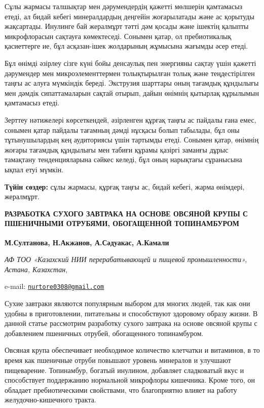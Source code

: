 Сұлы жармасы талшықтар мен дәрумендердің қажетті мөлшерін қамтамасыз
етеді, ал бидай кебегі минералдардың деңгейін жоғарылатады және ас
қорытуды жақсартады. Инулинге бай жералмұрт тәтті дәм қосады және
ішектің қалыпты микрофлорасын сақтауға көмектеседі. Сонымен қатар, ол
пребиотикалық қасиеттерге ие, бұл асқазан-ішек жолдарының жұмысына
жағымды әсер етеді.

Бұл өнімді әзірлеу сізге күні бойы денсаулық пен энергияны сақтау үшін
қажетті дәрумендер мен микроэлементтермен толықтырылған толық және
теңдестірілген таңғы ас алуға мүмкіндік береді. Экструзия шарттары оның
тағамдық құндылығы мен дәмдік сипаттамаларын сақтай отырып, дайын
өнімнің қытырлақ құрылымын қамтамасыз етеді.

Зерттеу нәтижелері көрсеткендей, әзірленген құрғақ таңғы ас пайдалы ғана
емес, сонымен қатар пайдалы тағамның дәмді нұсқасы болып табылады, бұл
оны тұтынушылардың кең аудиториясы үшін тартымды етеді. Сонымен қатар,
өнімнің жоғары тағамдық құндылығы мен табиғи құрамы қазіргі заманғы
дұрыс тамақтану тенденцияларына сәйкес келеді, бұл оның нарықтағы
сұранысына ықпал етуі мүмкін.

{\bfseries Түйін сөздер:} сұлы жармасы, құрғақ таңғы ас, бидай кебегі,
жарма өнімдері, жералмұрт.

{\bfseries РАЗРАБОТКА СУХОГО ЗАВТРАКА НА ОСНОВЕ ОВСЯНОЙ КРУПЫ С ПШЕНИЧНЫМИ
ОТРУБЯМИ, ОБОГАЩЕННОЙ ТОПИНАМБУРОМ}

{\bfseries М.Султанова, Н.Акжанов\textsuperscript{\envelope }, А.Сәдуакас, А.Камали}

\emph{АФ ТОО «Казахский НИИ перерабатывающей и пищевой промышленности»,
Астана, Казахстан},

e-mail:
\href{mailto:nurtore0308@gmail.com}{\nolinkurl{nurtore0308@gmail.com}}

Сухие завтраки являются популярным выбором для многих людей, так как они
удобны в приготовлении, питательны и способствуют здоровому образу
жизни. В данной статье рассмотрим разработку сухого завтрака на основе
овсяной крупы с добавлением пшеничных отрубей, обогащенного
топинамбуром.

Овсяная крупа обеспечивает необходимое количество клетчатки и витаминов,
в то время как пшеничные отруби повышают уровень минералов и улучшают
пищеварение. Топинамбур, богатый инулином, добавляет сладковатый вкус и
способствует поддержанию нормальной микрофлоры кишечника. Кроме того, он
обладает пребиотическими свойствами, что благоприятно влияет на работу
желудочно-кишечного тракта.

